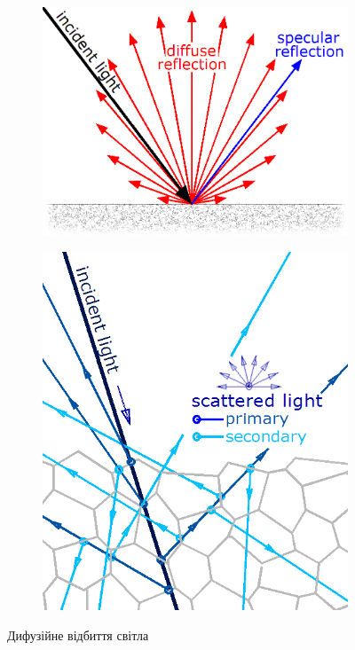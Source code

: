 \documentclass[
	a4paper,
	oneside,
	BCOR = 10mm,
	DIV = 12,
	12pt,
	headings = normal,
]{scrartcl}
\begin{document}
			\begin{figure}
				\centering
				\begin{subfigure}{0.5\textwidth}
					\centering
					\includegraphics[height = 8\baselineskip]{./assets/diffuse-reflection-lambert.png}
					\caption{}
					\label{subfig:diffuse-reflection-labertian}
				\end{subfigure}%
				\begin{subfigure}{0.5\textwidth}
					\centering
					\includegraphics[height = 8\baselineskip]{./assets/diffuse-reflection-subsurface.png}
					\caption{}
					\label{subfig:diffuse-reflection-subsurface}
				\end{subfigure}
				\caption{Дифузійне відбиття світла}
				\label{fig:diffuse-reflection}
			\end{figure}
\end{document}
